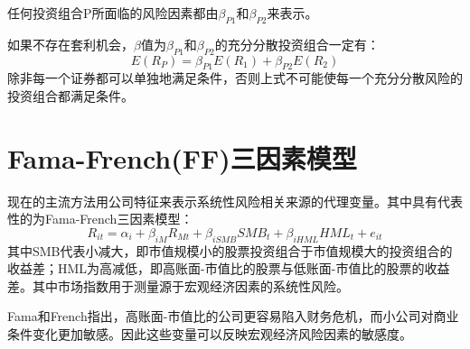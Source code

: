\documentclass{article}
\begin{document}
任何投资组合P所面临的风险因素都由$ \beta_{P1} $和$ \beta_{P2} $来表示。

如果不存在套利机会，$\beta$值为$ \beta_{P1} $和$ \beta_{P2} $的充分分散投资组合一定有：
\[
E(R_P)=\beta_{P1}E(R_1)+\beta_{P2}E(R_2)
\]
除非每一个证券都可以单独地满足条件，否则上式不可能使每一个充分分散风险的投资组合都满足条件。

\section{Fama-French(FF)三因素模型}
现在的主流方法用公司特征来表示系统性风险相关来源的代理变量。其中具有代表性的为Fama-French三因素模型：
\[
R_{it}=\alpha_i+\beta_{iM}R_{Mt}+\beta_{iSMB}SMB_t+\beta_{iHML}HML_t+e_{it}
\]
其中SMB代表小减大，即市值规模小的股票投资组合于市值规模大的投资组合的收益差；HML为高减低，即高账面-市值比的股票与低账面-市值比的股票的收益差。其中市场指数用于测量源于宏观经济因素的系统性风险。

Fama和French指出，高账面-市值比的公司更容易陷入财务危机，而小公司对商业条件变化更加敏感。因此这些变量可以反映宏观经济风险因素的敏感度。
\end{document}
